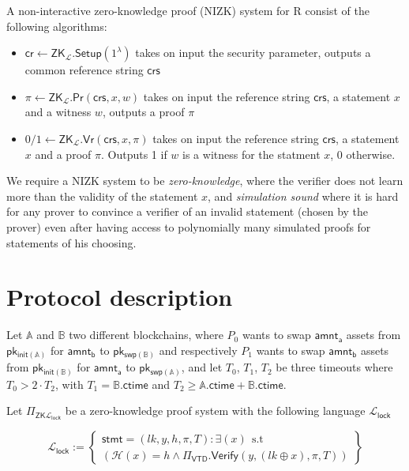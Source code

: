 \documentclass{article}      	%
\begin{document}
A non-interactive zero-knowledge proof (NIZK) system for R consist of the following algorithms:
\begin{itemize}
    \item $\mathsf{cr} \gets \mathsf{ZK}_\mathcal{L}.\mathsf{Setup}(1^\lambda)$ takes on input the security parameter, outputs a common reference string $\mathsf{crs}$
    \item $\pi \gets \mathsf{ZK}_\mathcal{L}.\mathsf{Pr}(\mathsf{crs}, x, w)$ takes on input the reference string $\mathsf{crs}$, a statement $x$ and a witness $w$, outputs a proof $\pi$
    \item $0/1 \gets \mathsf{ZK}_\mathcal{L}.\mathsf{Vr}(\mathsf{crs}, x,\pi)$ takes on input the reference string $\mathsf{crs}$, a statement $x$ and a proof $\pi$. Outputs 1 if $w$ is a witness for the statment $x$, 0 otherwise.
\end{itemize}
We require a NIZK system to be \textit{zero-knowledge}, where the verifier does not learn more than the validity of the statement $x$, and \textit{simulation sound} where it is hard for any prover
to convince a verifier of an invalid statement (chosen by the prover) even after having access to polynomially many simulated proofs for statements of his choosing.


\section{Protocol description}



Let $\mathbb{A}$ and $\mathbb{B}$ two different blockchains, where $P_0$ wants to swap $\mathsf{amnt_a}$ assets from $\mathsf{pk_{init(\mathbb{A})}}$ for $\mathsf{amnt_b}$ to $\mathsf{pk_{swp(\mathbb{B})}}$ and respectively $P_1$ wants to swap $\mathsf{amnt_b}$ assets from $\mathsf{pk_{init(\mathbb{B})}}$ for $\mathsf{amnt_a}$ to $\mathsf{pk_{swp(\mathbb{A})}}$, and let
$T_0$, $T_1$, $T_2$ be three timeouts where  $T_0 > 2\cdot T_2$, with $T_1 =  \mathbb{B}.\mathsf{ctime}$ and $T_2 \geq \mathbb{A}.\mathsf{ctime} + \mathbb{B}.\mathsf{ctime}$. 

Let $\Pi_{\mathsf{ZK}\mathcal{L}_{\mathsf{lock}}}$ be a zero-knowledge proof system with the following language  $\mathcal{L}_{\mathsf{lock}}$

\[
    \mathcal{L}_{\mathsf{lock}} := \left\{\begin{array}{lr}  \mathsf{stmt} = (lk, y, h, \pi, T) : \exists (x) \:\: \text{s.t} \\
    (\mathcal{H}(x) = h \land \Pi_\mathsf{VTD}.\mathsf{Verify}(y, (lk \oplus x), \pi, T)) \end{array}\right\}
\]
\end{document}
